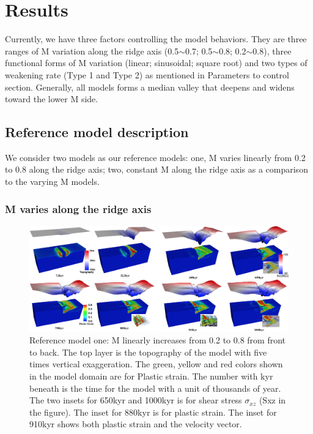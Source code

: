 \pagebreak
\section{Results}

Currently, we have three factors controlling the model behaviors. They are three ranges of M variation along the ridge axis (0.5$\sim$0.7; 0.5$\sim$0.8; 0.2$\sim$0.8), three functional forms of M variation (linear; sinusoidal; square root) and two types of weakening rate (Type 1 and Type 2) as mentioned in Parameters to control section. Generally, all models forms a median valley that deepens and widens toward the lower M side. 

\subsection{Reference model description}
We consider two models as our reference models: one, M varies linearly from 0.2 to 0.8 along the ridge axis; two, constant M along the ridge axis as a comparison to the varying M models.

\subsubsection{M varies along the ridge axis}

\begin{figure}[H]
  \centering
    \includegraphics[width=1.0\textwidth]{fig_Results1_1.png}
  \caption{Reference model one: M linearly increases from 0.2 to 0.8 from front to back. The top layer is the topography of the model with five times vertical exaggeration. The green, yellow and red colors shown in the model domain are for Plastic strain. The number with kyr beneath is the time for the model with a unit of thousands of year. The two insets for 650kyr and 1000kyr is for shear stress $\sigma_{xz}$ (Sxz in the figure). The inset for 880kyr is for plastic strain. The inset for 910kyr shows both plastic strain and the velocity vector.} %
 \label{fig_Results1_1}
\end{figure}   

